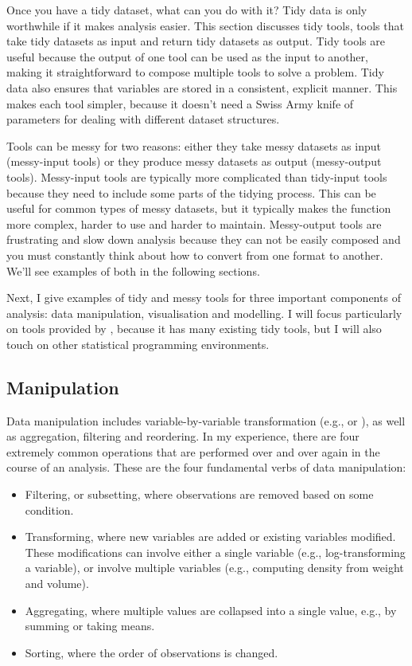 \documentclass[article]{jss}
\begin{document}
Once you have a tidy dataset, what can you do with it? Tidy data is only worthwhile if it makes analysis easier. This section discusses tidy tools, tools that take tidy datasets as input and return tidy datasets as output. Tidy tools are useful because the output of one tool can be used as the input to another, making it straightforward to compose multiple tools to solve a problem. Tidy data also ensures that variables are stored in a consistent, explicit manner. This makes each tool simpler, because it doesn't need a Swiss Army knife of parameters for dealing with different dataset structures.

Tools can be messy for two reasons: either they take messy datasets as input (messy-input tools) or they produce messy datasets as output (messy-output tools). Messy-input tools are typically more complicated than tidy-input tools because they need to include some parts of the tidying process. This can be useful for common types of messy datasets, but it typically makes the function more complex, harder to use and harder to maintain. Messy-output tools are frustrating and slow down analysis because they can not be easily composed and you must constantly think about how to convert from one format to another. We'll see examples of both in the following sections.

Next, I give examples of tidy and messy tools for three important components of analysis: data manipulation, visualisation and modelling. I will focus particularly on tools provided by  \citep{R}, because it has many existing tidy tools, but I will also touch on other statistical programming environments.

\subsection{Manipulation}

Data manipulation includes variable-by-variable transformation (e.g.,  or ), as well as aggregation, filtering and reordering. In my experience, there are four extremely common operations that are performed over and over again in the course of an analysis. These are the four fundamental verbs of data manipulation:

\begin{itemize}

  \item Filtering, or subsetting, where observations are removed based on some
  condition.

  \item Transforming, where new variables are added or existing variables
  modified. These modifications can involve either a single variable (e.g., 
  log-transforming a variable), or involve multiple variables (e.g., computing
  density from weight and volume).

  \item Aggregating, where multiple values are collapsed into a single value,
  e.g., by summing or taking means.

  \item Sorting, where the order of observations is changed.

\end{itemize}
\end{document}

